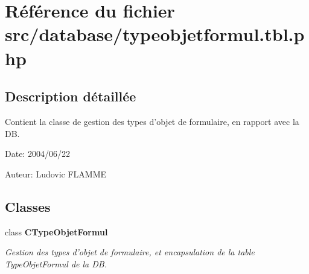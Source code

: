 \section{Référence du fichier src/database/typeobjetformul.tbl.php}
\label{typeobjetformul_8tbl_8php}


\subsection{Description détaillée}
Contient la classe de gestion des types d'objet de formulaire, en rapport avec la DB. 

\begin{Desc}
\item[Date:]2004/06/22\end{Desc}
\begin{Desc}
\item[Auteur:]Ludovic FLAMME \end{Desc}


\subsection*{Classes}
\begin{CompactItemize}
\item 
class {\bf CTypeObjetFormul}
\begin{CompactList}\small\item\em Gestion des types d'objet de formulaire, et encapsulation de la table TypeObjetFormul de la DB. \item\end{CompactList}\end{CompactItemize}
